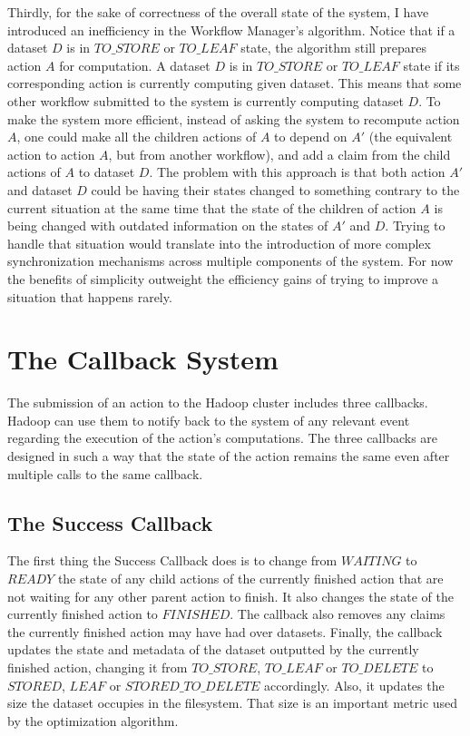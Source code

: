 Thirdly, for the sake of correctness of the overall state of the system, I have introduced an inefficiency in the Workflow Manager's algorithm. Notice that if a dataset $D$ is in $TO\_STORE$ or $TO\_LEAF$ state, the algorithm still prepares action $A$ for computation. A dataset $D$ is in $TO\_STORE$ or $TO\_LEAF$ state if its corresponding action is currently computing given dataset. This means that some other workflow submitted to the system is currently computing dataset $D$. To make the system more efficient, instead of asking the system to recompute action $A$, one could make all the children actions of $A$ to depend on $A'$ (the equivalent action to action $A$, but from another workflow), and add a claim from the child actions of $A$ to dataset $D$. The problem with this approach is that both action $A'$ and dataset $D$ could be having their states changed to something contrary to the current situation at the same time that the state of the children of action $A$ is being changed with outdated information on the states of $A'$ and $D$. Trying to handle that situation would translate into the introduction of more complex synchronization mechanisms across multiple components of the system. For now the benefits of simplicity outweight the efficiency gains of trying to improve a situation that happens rarely.

\section{The Callback System}
\label{sec:callback_system}
The submission of an action to the Hadoop cluster includes three callbacks. Hadoop can use them to notify back to the system of any relevant event regarding the execution of the action's computations. The three callbacks are designed in such a way that the state of the action remains the same even after multiple calls to the same callback.

\subsection{The Success Callback}
The first thing the Success Callback does is to change from $WAITING$ to $READY$ the state of any child actions of the currently finished action that are not waiting for any other parent action to finish. It also changes the state of the currently finished action to $FINISHED$. The callback also removes any claims the currently finished action may have had over datasets. Finally, the callback updates the state and metadata of the dataset outputted by the currently finished action, changing it from $TO\_STORE$, $TO\_LEAF$ or $TO\_DELETE$ to $STORED$, $LEAF$ or $STORED\_TO\_DELETE$ accordingly. Also, it updates the size the dataset occupies in the filesystem. That size is an important metric used by the optimization algorithm.

